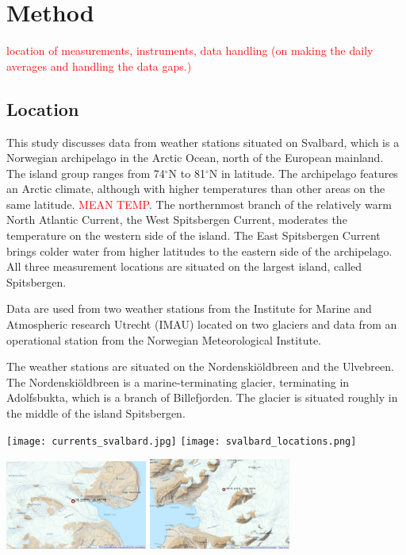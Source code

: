 \documentclass[11pt]{report}
\begin{document}
\newpage

\chapter{Method}\label{sec:method}
\textcolor{red}{location of measurements, instruments, data handling (on making the daily averages and handling the data gaps.)}

\section{Location}
This study discusses data from weather stations situated on Svalbard, which is a Norwegian archipelago in the Arctic Ocean, north of the European mainland. The island group ranges from 74$^\circ$N to 81$^\circ$N in latitude. The archipelago features an Arctic climate, although with higher temperatures than other areas on the same latitude. \textcolor{red}{MEAN TEMP}. The northernmost branch of the relatively warm North Atlantic Current, the West Spitsbergen Current, moderates the temperature on the western side of the island. The East Spitsbergen Current brings colder water from higher latitudes to the eastern side of the archipelago. All three measurement locations are situated on the largest island, called Spitsbergen. 

Data are used from two weather stations from the Institute for Marine and Atmospheric research Utrecht (IMAU) located on two glaciers and data from an operational station from the Norwegian Meteorological Institute. 

The weather stations are situated on the Nordenskiöldbreen and the Ulvebreen. The Nordenskiöldbreen is a marine-terminating glacier, terminating in Adolfsbukta, which is a branch of Billefjorden. The glacier is situated roughly in the middle of the island Spitsbergen. 

\texttt{[image: currents\_svalbard.jpg]}
\texttt{[image: svalbard\_locations.png]}



\includegraphics[scale=1, width=0.35\textwidth]{ulvemap.jpg}
\includegraphics[scale=1, width=0.35\textwidth]{nskimap.jpg}
\end{document}
